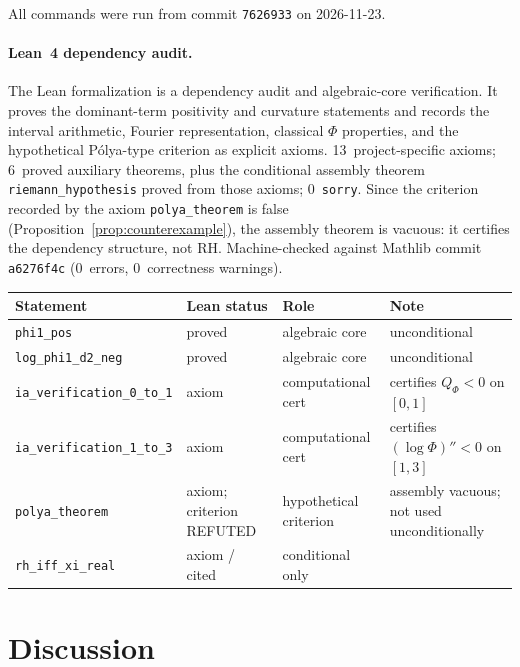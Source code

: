\documentclass[11pt]{article}
\theoremstyle{definition}
\theoremstyle{remark}
\begin{document}
All commands were run from commit \texttt{7626933} on 2026-11-23.

\paragraph{Lean~4 dependency audit.}
The Lean formalization is a dependency audit and algebraic-core verification.
It proves the dominant-term positivity and curvature statements and records the
interval arithmetic, Fourier representation, classical $\Phi$ properties, and
the hypothetical P\'{o}lya-type criterion as explicit axioms.
13~project-specific axioms; 6~proved auxiliary theorems, plus the
conditional assembly theorem \texttt{riemann\_hypothesis} proved from
those axioms; 0~\texttt{sorry}.
Since the criterion recorded by the axiom \texttt{polya\_theorem} is
false (Proposition~\ref{prop:counterexample}), the assembly theorem is
vacuous: it certifies the dependency structure, not RH.
Machine-checked against Mathlib commit \texttt{a6276f4c} (0~errors, 0~correctness warnings).

\begin{center}\footnotesize
\begin{tabular}{@{}lp{3.0cm}p{2.5cm}p{3.5cm}@{}}
\toprule
Statement & Lean status & Role & Note \\
\midrule
\texttt{phi1\_pos} & proved & algebraic core & unconditional \\
\texttt{log\_phi1\_d2\_neg} & proved & algebraic core & unconditional \\
\texttt{ia\_verification\_0\_to\_1} & axiom & computational cert & certifies $Q_\Phi < 0$ on $[0,1]$ \\
\texttt{ia\_verification\_1\_to\_3} & axiom & computational cert & certifies $(\log\Phi)'' < 0$ on $[1,3]$ \\
\texttt{polya\_theorem} & axiom; criterion REFUTED & hypothetical criterion &
  assembly vacuous; not used unconditionally \\
\texttt{rh\_iff\_xi\_real} & axiom / cited & conditional only &
  \cite[\S2.1]{titchmarsh1986} \\
\bottomrule
\end{tabular}
\end{center}

\section{Discussion}
\label{sec:discussion}
\end{document}
